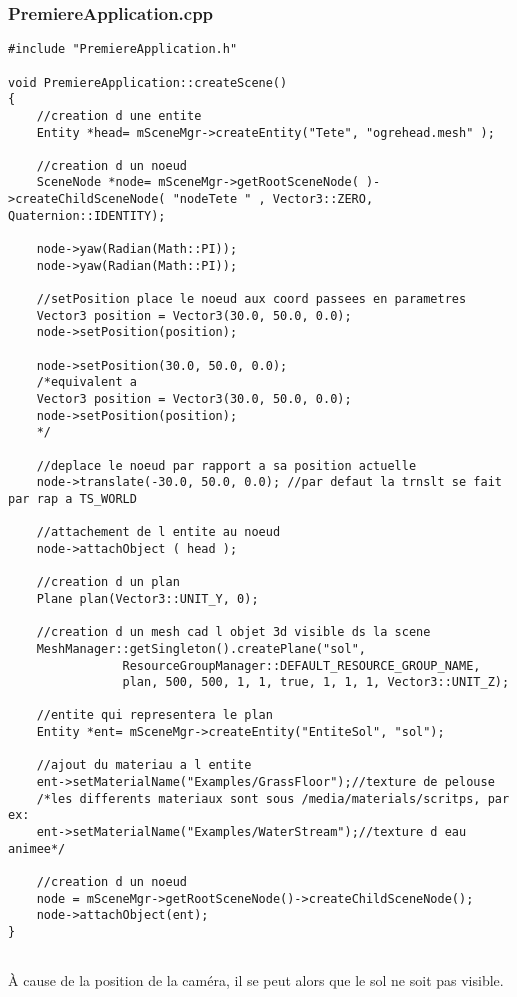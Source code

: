 \subsubsection{PremiereApplication.cpp}
\begin{lstlisting}[caption={PremiereApplication.cpp: Création d'un sol}]
#include "PremiereApplication.h"

void PremiereApplication::createScene()
{
    //creation d une entite
    Entity *head= mSceneMgr->createEntity("Tete", "ogrehead.mesh" );
    
    //creation d un noeud
    SceneNode *node= mSceneMgr->getRootSceneNode( )->createChildSceneNode( "nodeTete " , Vector3::ZERO, Quaternion::IDENTITY);
    
    node->yaw(Radian(Math::PI));
    node->yaw(Radian(Math::PI));

    //setPosition place le noeud aux coord passees en parametres
    Vector3 position = Vector3(30.0, 50.0, 0.0);
    node->setPosition(position);

    node->setPosition(30.0, 50.0, 0.0); 
    /*equivalent a
    Vector3 position = Vector3(30.0, 50.0, 0.0);
    node->setPosition(position);
    */

    //deplace le noeud par rapport a sa position actuelle
    node->translate(-30.0, 50.0, 0.0); //par defaut la trnslt se fait par rap a TS_WORLD
   
    //attachement de l entite au noeud
    node->attachObject ( head );

    //creation d un plan
    Plane plan(Vector3::UNIT_Y, 0);

    //creation d un mesh cad l objet 3d visible ds la scene
    MeshManager::getSingleton().createPlane("sol",
                ResourceGroupManager::DEFAULT_RESOURCE_GROUP_NAME,
                plan, 500, 500, 1, 1, true, 1, 1, 1, Vector3::UNIT_Z); 

    //entite qui representera le plan
    Entity *ent= mSceneMgr->createEntity("EntiteSol", "sol");

    //ajout du materiau a l entite
    ent->setMaterialName("Examples/GrassFloor");//texture de pelouse
    /*les differents materiaux sont sous /media/materials/scritps, par ex:
    ent->setMaterialName("Examples/WaterStream");//texture d eau animee*/

    //creation d un noeud
    node = mSceneMgr->getRootSceneNode()->createChildSceneNode();
    node->attachObject(ent);
}


\end{lstlisting}

À cause de la position de la caméra, il se peut alors que le sol ne soit pas visible.

